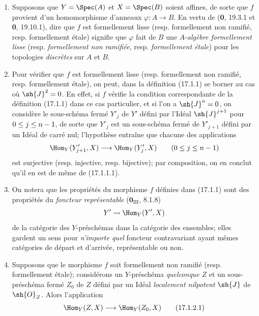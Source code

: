 \begin{remarks}[17.1.2]
\label{IV.17.1.2}
\begin{enumerate}
  \item[(i)] Supposons que $Y=\Spec(A)$ et $X=\Spec(B)$ soient affines, de sorte que $f$ provient d'un homomorphisme d'anneaux $\varphi:A\to B$. En vertu de (\textbf{0}, 19.3.1 et \textbf{0}, 19.10.1), dire que $f$ est formellement lisse (resp. formellement non ramifié, resp. formellement étale) signifie que $\varphi$ fait de $B$ une $A$-\emph{algèbre formellement lisse} (resp. \emph{formellement non ramifiée}, resp. \emph{formellement étale}) pour les topologies \emph{discrètes} sur $A$ et $B$.
  \item[(ii)] Pour vérifier que $f$ est formellement lisse (resp. formellement non ramifié, resp. formellement étale), on peut, dans la définition (17.1.1) se borner au cas où $\sh{J}^2=0$. En effet, si $f$ vérifie la condition correspondante de la définition (17.1.1) dans ce cas particulier, et si l'on a $\sh{J}^n=0$, on considère le sous-schéma fermé $Y'_j$ de $Y'$ défini par l'Idéal $\sh{J}^{j+1}$ pour $0\leq j\leq n- 1$, de sorte que $Y'_j$ est un sous-schéma fermé de $Y'_{j+1}$ défini par un Idéal de carré nul; l'hypothèse entraîne que chacune des applications
  \[
    \Hom_Y(Y'_{j+1},X)\longrightarrow\Hom_Y(Y'_j,X)\qquad(0\leq j\leq n\setmin 1)
  \]
  est surjective (resp. injective, resp. bijective); par composition, on en conclut qu'il en est de même de (17.1.1.1).
  \item[(iii)] On notera que les propriétés du morphisme $f$ définies dans (17.1.1) sont des propriétés du \emph{foncteur représentable} ($\mathbf{0}_{\mathrm{III}}$, 8.1.8)
  \[
    Y'\leadsto\Hom_Y(Y',X)
  \]
  de la catégorie des $Y$-préschémas dans la catégorie des ensembles; elles gardent un sens pour \emph{n'importe quel} foncteur contravariant ayant mêmes catégories de départ et d'arrivée, représentable ou non.
  \item[(iv)] Supposons que le morphisme $f$ soit formellement non ramifié (resp. formellement étale); considérons un $Y$-préschéma \emph{quelconque} $Z$ et un sous-préschéma fermé $Z_0$ de $Z$ défini par un Idéal \emph{localement nilpotent} $\sh{J}$ de $\sh{O}_Z$. Alors l'application
  \[
  \label{IV.17.1.2.1}
    \Hom_Y(Z,X)\longrightarrow\Hom_Y(Z_0,X)
    \tag{17.1.2.1}
  \]

\end{enumerate}
\end{remarks}
